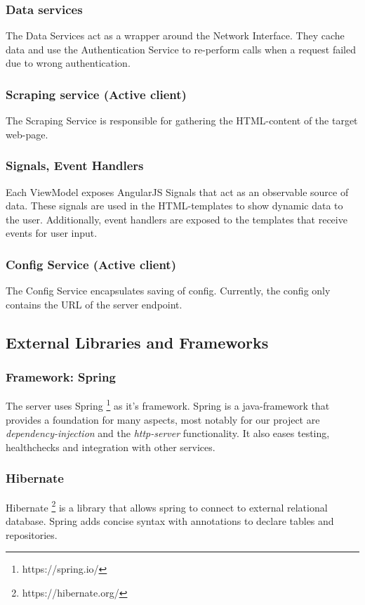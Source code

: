 \subsubsection{Data services}
The Data Services act as a wrapper around the Network Interface.
They cache data and use the Authentication Service to re-perform calls when a request failed due to wrong authentication.

\subsubsection{Scraping service (Active client)}
The Scraping Service is responsible for gathering the HTML-content of the target web-page.

\subsubsection{Signals, Event Handlers}
Each ViewModel exposes AngularJS Signals that act as an observable source of data.
These signals are used in the HTML-templates to show dynamic data to the user. \newline
Additionally, event handlers are exposed to the templates that receive events for user input.

\subsubsection{Config Service (Active client)}
The Config Service encapsulates saving of config. \newline
Currently, the config only contains the URL of the server endpoint.

\subsection{External Libraries and Frameworks}\label{subsec:external-libraries-and-frameworks}
\subsubsection{Framework: Spring}
The server uses Spring \footnote{https://spring.io/} as it's framework.
Spring is a java-framework that provides a foundation for many aspects, most notably for our project are \textit{dependency-injection} and the \textit{http-server} functionality.
It also eases testing, healthchecks and integration with other services.

\subsubsection{Hibernate}
Hibernate \footnote{https://hibernate.org/} is a library that allows spring to connect to external relational database.
Spring adds concise syntax with annotations to declare tables and repositories.


